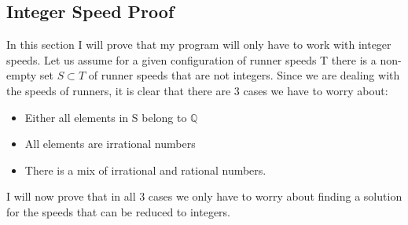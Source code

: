 \subsection{Integer Speed Proof}
\label{integerSpeeds}
In this section I will prove that my program will only have to work with integer speeds.
Let us assume for a given configuration of runner speeds T there is a non-empty set $S \subset T$ of runner speeds that are not integers. Since we are dealing with the speeds of runners, it is clear that there are 3 cases we have to worry about: 
\begin{itemize}
\item Either all elements in S belong to $\mathbb{Q}$
\item All elements are irrational numbers
\item There is a mix of irrational and rational numbers.
\end{itemize}

I will now prove that in all 3 cases we only have to worry about finding a solution for the speeds that can be reduced to integers.

